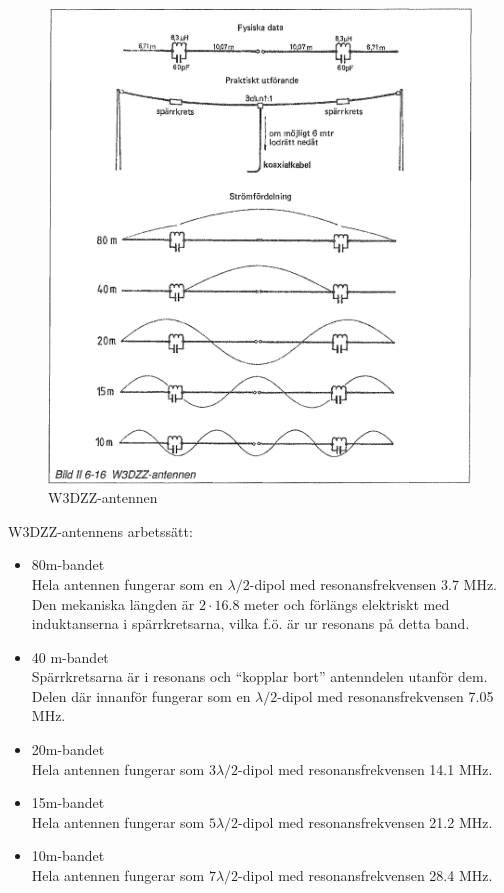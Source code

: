 \begin{figure}
  \includegraphics[width=\textwidth]{images/bild_2_6-16}
  \caption{W3DZZ-antennen}
  \label{fig:bildII6-16}
\end{figure}

W3DZZ-antennens arbetssätt:
\begin{itemize}
  \item 80m-bandet \\ Hela antennen fungerar som en
    \(\lambda/2\)-dipol med resonansfrekvensen 3.7 MHz.  Den mekaniska
    längden är \(2 \cdot 16.8\) meter och förlängs elektriskt med
    induktanserna i spärrkretsarna, vilka f.ö. är ur resonans på detta
    band.
  \item 40 m-bandet \\ Spärrkretsarna är i resonans och ``kopplar
    bort'' antenndelen utanför dem. Delen där innanför fungerar som en
    \(\lambda/2\)-dipol med resonansfrekvensen 7.05 MHz.

  \item 20m-bandet \\ Hela antennen fungerar som \(3\lambda/2\)-dipol
    med resonansfrekvensen 14.1 MHz.

  \item 15m-bandet \\ Hela antennen fungerar som \(5\lambda/2\)-dipol
    med resonansfrekvensen 21.2 MHz.

  \item 10m-bandet \\ Hela antennen fungerar som \(7\lambda/2\)-dipol
    med resonansfrekvensen 28.4 MHz.
\end{itemize}
